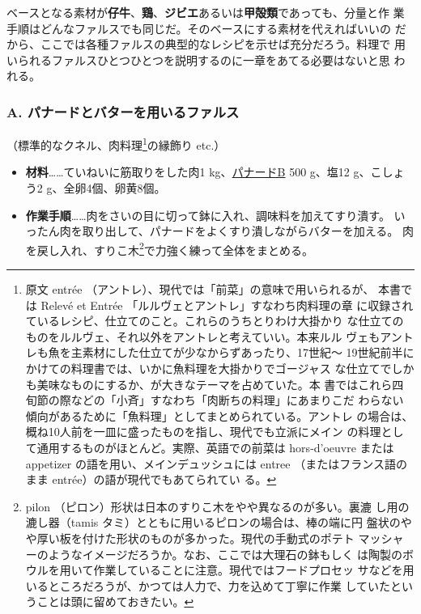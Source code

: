 ベースとなる素材が\textbf{仔牛}、\textbf{鶏}、\textbf{ジビエ}あるいは\textbf{甲殻類}であっても、分量と作
業手順はどんなファルスでも同じだ。そのベースにする素材を代えればいいの
だから、ここでは各種ファルスの典型的なレシピを示せば充分だろう。料理で
用いられるファルスひとつひとつを説明するのに一章をあてる必要はないと思
われる。
\begin{recette}
\hypertarget{farce-a}{%
\subsubsection{A. パナードとバターを用いるファルス}\label{farce-a}}



（標準的なクネル、肉料理\footnote{原文 entrée
  （アントレ）、現代では「前菜」の意味で用いられるが、 本書では Relevé
  et Entrée 「ルルヴェとアントレ」すなわち肉料理の章
  に収録されているレシピ、仕立てのこと。これらのうちとりわけ大掛かり
  な仕立てのものをルルヴェ、それ以外をアントレと考えていい。本来ルル
  ヴェもアントレも魚を主素材にした仕立てが少なからずあったり、17世紀〜
  19世紀前半にかけての料理書では、いかに魚料理を大掛かりでゴージャス
  な仕立てでしかも美味なものにするか、が大きなテーマを占めていた。本
  書ではこれら四旬節の際などの「小斉」すなわち「肉断ちの料理」にあまりこだ
  わらない傾向があるために「魚料理」としてまとめられている。アントレ
  の場合は、概ね10人前を一皿に盛ったものを指し、現代でも立派にメイン
  の料理として通用するものがほとんど。実際、英語での前菜は hors-d'oeuvre
  または appetizer の語を用い、メインデュッシュには entree
  （またはフランス語のまま entrée）の語が現代でもあてられてい る。}の縁飾り
etc.）

\begin{itemize}
\item
  \textbf{材料}\ldots{}\ldots{}ていねいに筋取りをした肉1
  kg、\protect\hyperlink{panade-b}{パナードB} 500 g、塩12 g、こしょう2
  g、全卵4個、卵黄8個。
\item
  \textbf{作業手順}\ldots{}\ldots{}肉をさいの目に切って鉢に入れ、調味料を加えてすり潰す。
  いったん肉を取り出して、パナードをよくすり潰しながらバターを加える。
  肉を戻し入れ、すりこ木\footnote{pilon
    （ピロン）形状は日本のすりこ木をやや異なるのが多い。裏漉
    し用の漉し器（tamis タミ）とともに用いるピロンの場合は、棒の端に円
    盤状のやや厚い板を付けた形状のものが多かった。現代の手動式のポテト
    マッシャーのようなイメージだろうか。なお、ここでは大理石の鉢もしく
    は陶製のボウルを用いて作業していることに注意。現代ではフードプロセッ
    サなどを用いるところだろうが、かつては人力で、力を込めて丁寧に作業
    していたということは頭に留めておきたい。}で力強く練って全体をまとめる。
\end{itemize}


\end{recette}
